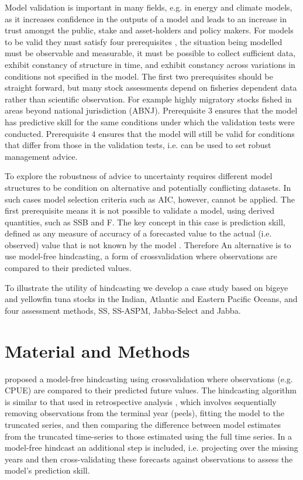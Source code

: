 \documentclass[a4paper]{article}
\begin{document}
Model validation is important in many fields, e.g. in energy and climate models, as it increases confidence in the outputs of a model and leads to an increase in trust amongst the public, stake and asset-holders and policy makers. For models to be valid they must satisfy four prerequisites \cite{hodges1992you}, the situation being modelled must be observable and measurable, it must be possible to collect sufficient data, exhibit constancy of structure in time, and exhibit constancy across variations in conditions not specified in the model. The first two prerequisites should be straight forward, but many stock assessments depend on fisheries dependent data rather than scientific observation. For example highly migratory stocks fished in areas beyond national jurisdiction (ABNJ). Prerequisite 3 ensures that the model has predictive skill for the same conditions under which the validation tests were conducted. Prerequisite 4 ensures that the model will still be valid for conditions that differ from those in the validation tests, i.e. can be used to set robust management advice. 

To explore the robustness of advice to uncertainty requires different model structures to be condition on alternative and potentially conflicting datasets. In such cases model selection criteria such as AIC, however, cannot be applied. The first prerequisite means it is not possible to validate a model, using derived quantities, such as SSB and F. The key concept in this case is prediction skill, defined as any measure of accuracy of a forecasted value to the actual (i.e. observed) value that is not known by the model \citep{glickman2000glossary}. Therefore  An alternative is to use model-free hindcasting, a form of crossvalidation where observations are compared to their predicted values.

To illustrate the utility of hindcasting we develop a case study based on bigeye and yellowfin tuna stocks in the Indian, Atlantic and Eastern Pacific Oceans, and four assessment methods, SS, SS-ASPM, Jabba-Select and Jabba. 

\section{Material and Methods}

\cite{kell2016xval} proposed a model-free hindcasting using crossvalidation where observations (e.g. CPUE) are compared to their predicted future values. The hindcasting algorithm is similar to that used in retrospective analysis \citep{hurtado2014looking}, which involves sequentially removing  observations from the terminal year (peels), fitting the model to the truncated series, and then comparing the difference between model estimates from the truncated time-series to those estimated using the full time series. In a model-free hindcast an additional step is included, i.e. projecting over the missing years and then cross-validating these forecasts against observations to assess the model’s prediction skill.
\end{document}
